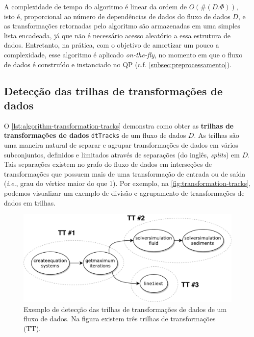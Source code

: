 A complexidade de tempo do algoritmo é linear da ordem de \( O(\#(D.\Phi)) \), isto é, proporcional ao número de dependências de dados do fluxo de dados \( D \), e as transformações retornadas pelo algoritmo são armazenadas em uma simples lista encadeada, já que não é necessário acesso aleatório a essa estrutura de dados. Entretanto, na prática, com o objetivo de amortizar um pouco a complexidade, esse algoritmo é aplicado \textit{on-the-fly}, no momento em que o fluxo de dados é construído e instanciado no QP (c.f. \autoref{subsec:preprocessamento}).

\subsection{Detecção das trilhas de transformações de dados}%
\label{subsec:deteccao-das-trilhas-de-transformacoes}

O \autoref{lst:algorithm-transformation-tracks} demonstra como obter as \textbf{trilhas de transformações de dados} \texttt{dtTracks} de um fluxo de dados \( D \). As trilhas são uma maneira natural de separar e agrupar transformações de dados em vários subconjuntos, definidos e limitados através de separações (do inglês, \textit{splits}) em \( D \). Tais separações existem no grafo do fluxo de dados em interseções de transformações que possuem mais de uma transformação de entrada ou de saída (\textit{i.e.}, grau do vértice maior do que 1). Por exemplo, na \autoref{fig:transformation-tracks}, podemos visualizar um exemplo de divisão e agrupamento de transformações de dados em trilhas.

\begin{figure}[htb]
    \centering
    \includegraphics[width=\textwidth]{img/transformation-tracks}
    \caption[Exemplo de detecção das trilhas de transformações]{Exemplo de detecção das trilhas de transformações de dados de um fluxo de dados. Na figura existem três trilhas de transformações (\textsc{TT}).}%
    \label{fig:transformation-tracks}
\end{figure}

